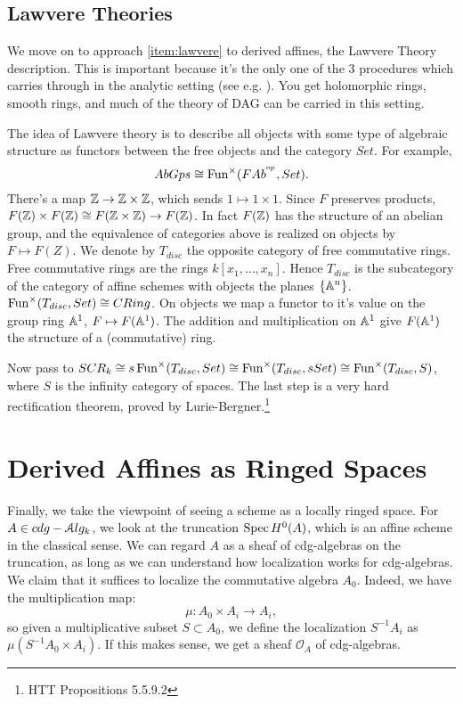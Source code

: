 \documentclass[10pt,a4paper,reqno,oneside]{book} %
\theoremstyle{plain}
\theoremstyle{definition}
\theoremstyle{remark}
\numberwithin{equation}{section}
\begin{document}

\subsection{Lawvere Theories}

We move on to approach \ref{item:lawvere} to derived affines, the Lawvere Theory description. 
This is important because
it's the only one of the 3 procedures which carries through in the analytic setting (see e.g. \cite{Porta_Yu_Higher_analytic_stacks_2014}). You get holomorphic rings, smooth rings,
and much of the theory of DAG can be carried in this setting.

The idea of Lawvere theory is to describe all objects with some type of algebraic structure as functors between the free objects and the category $Set$.
For example,
\[	AbGps \cong \operatorname{Fun}^{\times}(FAb^{^\mathrm{op}}, Set).	\]
There's a map $\mathbb Z \to \mathbb Z \times \mathbb Z$, which sends $1\mapsto 1\times 1$. Since $F$ preserves products, $F(\mathbb Z) \times F(\mathbb Z)
\cong F(\mathbb Z \times \mathbb Z) \to F(\mathbb Z)$.  In fact $F(\mathbb Z)$ has the structure of an abelian group, and the equivalence of categories above is realized on objects by $F \mapsto F(Z)$.  We denote by $T_{disc}$ the opposite category of free commutative rings.  Free commutative rings are the rings $k[x_1, \dots, x_n]$. Hence $T_{disc}$ is the subcategory of the category of affine schemes with objects the planes $\{\mathbb A^n\}$.
$\operatorname{Fun}^{\times}(T_{disc}, Set) \cong CRing$. On objects we map a functor to it's value on the group ring $\mathbb A^{1}$, $F\mapsto F(\mathbb A^{1})$.  The addition and multiplication on $\mathbb A^{1}$ give $F(\mathbb A^{1})$ the structure of a (commutative) ring.  

Now pass to $SCR_k \cong s\operatorname{Fun}^{\times}(T_{disc}, Set) \cong \operatorname{Fun}^{\times}(T_{disc}, sSet) \cong \operatorname{Fun}^{\times}
(T_{disc}, S)$, where $S$ is the infinity category of spaces. The last step is a very hard rectification theorem, proved
by Lurie-Bergner.\footnote{HTT Propositions 5.5.9.2} 


\section{Derived Affines as Ringed Spaces}

Finally, we take the viewpoint of seeing a scheme as a locally ringed space. For $A \in cdg-\mathcal A lg_k$, we look at
the truncation $\operatorname{Spec} H^0(A)$, which is an affine scheme in the classical sense. We can regard $A$ 
as a sheaf of cdg-algebras on the truncation, as long as we can understand how localization works for cdg-algebras. 
We claim that it suffices to localize the commutative algebra $A_0$. Indeed, we have the multiplication map:
\[	\mu:	A_0 \times A_i \to A_i,		\]
so given a multiplicative subset $S \subset A_0$, we define the localization $S^{-1}A_i$ as $\mu(S^{-1}A_0 \times A_i)$.
If this makes sense, we get a sheaf $\mathcal{O}_A$ of cdg-algebras.
\end{document}
